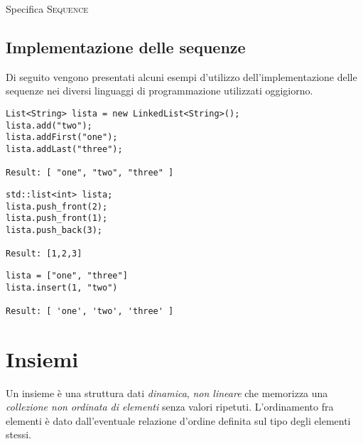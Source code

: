 \begin{algorithm}[H]
	\caption{Specifica \textsc{Sequence}}
	
\end{algorithm}

\clearpage
\subsection{Implementazione delle sequenze}

Di seguito vengono presentati alcuni esempi d'utilizzo dell'implementazione delle sequenze nei diversi linguaggi di programmazione utilizzati oggigiorno.

\begin{code}
\begin{verbatim}
List<String> lista = new LinkedList<String>();
lista.add("two");
lista.addFirst("one");
lista.addLast("three");

Result: [ "one", "two", "three" ]
\end{verbatim}
\end{code}

\begin{code}
\begin{verbatim}
std::list<int> lista;
lista.push_front(2);
lista.push_front(1);
lista.push_back(3);

Result: [1,2,3]
\end{verbatim}
\end{code}

\begin{code}
\begin{verbatim}
lista = ["one", "three"]
lista.insert(1, "two")

Result: [ 'one', 'two', 'three' ]
\end{verbatim}
\end{code}

\section{Insiemi}

Un insieme è una struttura dati \emph{dinamica}, \emph{non lineare} che memorizza una \emph{collezione non ordinata di elementi} senza valori ripetuti.
L'ordinamento fra elementi è dato dall'eventuale relazione d'ordine definita sul tipo degli elementi stessi.

